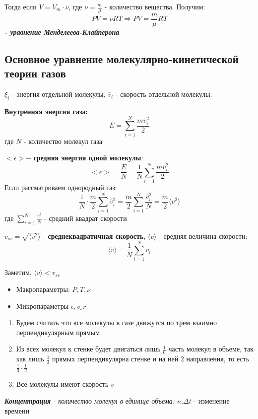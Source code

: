 \documentclass[../main.tex]{subfiles}
\begin{document}
\vspace{5px}

Тогда если $V = V_m \cdot \nu$, где $\nu = \frac{m}{\mu}$ - количество вещества. Получим:
\[ PV = \nu R T \Rightarrow PV = \frac{m}{\mu} R T \]
\textit{\textbf{- уравнение Менделеева-Клайперона}}


\subsection{Основное уравнение молекулярно-кинетической теории газов}

$\xi_i$ - энергия отдельной молекулы, $\bar v_i$ - скорость отдельной молекулы.

\vspace{6px}

\textbf{Внутренняя энергия газа:} \[ E = \sum_{i = 1}^N \frac{m \bar v_i^2}{2}\] где $N$ - количество молекул газа

\vspace{6px}

$<\epsilon> - $ \textbf{средняя энергия одной молекулы}:
\[ <\epsilon> = \frac{E}{N} = \frac{1}{N} \sum_{i = 1}^N \frac{m \bar v_i^2}{2} \]
Если рассматриваем однородный газ:
\[ \frac{1}{N} \cdot \frac{m}{2} \sum_{i = 1}^N {\bar v_i^2} = \frac{m}{2} \sum_{i = 1}^N \frac{\bar v_i^2}{N} = \frac{m}{2} \langle v^2 \rangle\]
где $\sum_{i = 1}^N \frac{\bar v_i^2}{N}$ - средний квадрат скорости

\vspace{6px}

$v_{sr} = \sqrt{\langle v^2 \rangle}$ - \textbf{среднеквадратичная скорость}, $\langle v \rangle$ - средняя величина скорости: \[ \langle v \rangle = \frac{1}{N}\sum_{i = 1}^N {v_i} \]

Заметим, $\langle v \rangle < v_{sr}$

\vspace{6px}
\begin{itemize}
    \item Макропараметры: $P, T ,\nu$
    \item Микропараметры $\epsilon, v_sr$
\end{itemize}

\begin{enumerate}
    \item Будем считать что все молекулы в газе движутся по трем взаимно перпендикулярным прямым
    \item Из всех молекул к стенке будет двигаться лишь $\frac{1}{6}$ часть молекул в объеме, так как лишь $\frac{1}{3}$ прямых перпендикулярна стенке и на ней 2 направления, то есть $\frac{1}{3} \cdot \frac{1}{2}$
    \item Все молекулы имеют скорость $v$
\end{enumerate}
 \textit{\textbf{Концентрация} - количество молекул в единице объема:} $n. \Delta t$ - изменение времени
\end{document}
